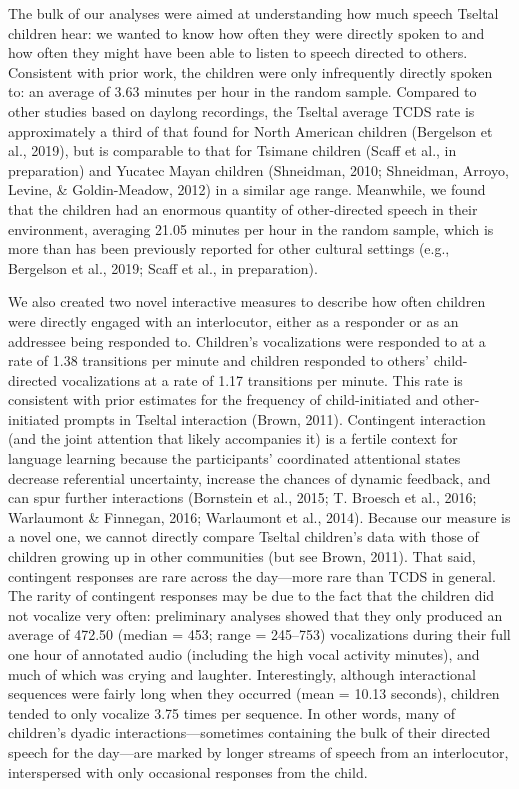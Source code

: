 \documentclass[floatsintext,man]{apa6}
\theoremstyle{definition}
\theoremstyle{definition}
\theoremstyle{definition}
\theoremstyle{remark}
\begin{document}
The bulk of our analyses were aimed at understanding how much speech
Tseltal children hear: we wanted to know how often they were directly
spoken to and how often they might have been able to listen to speech
directed to others. Consistent with prior work, the children were only
infrequently directly spoken to: an average of 3.63 minutes per hour in
the random sample. Compared to other studies based on daylong
recordings, the Tseltal average TCDS rate is approximately a third of
that found for North American children (Bergelson et al., 2019), but is
comparable to that for Tsimane children (Scaff et al., in preparation)
and Yucatec Mayan children (Shneidman, 2010; Shneidman, Arroyo, Levine,
\& Goldin-Meadow, 2012) in a similar age range. Meanwhile, we found that
the children had an enormous quantity of other-directed speech in their
environment, averaging 21.05 minutes per hour in the random sample,
which is more than has been previously reported for other cultural
settings (e.g., Bergelson et al., 2019; Scaff et al., in preparation).

We also created two novel interactive measures to describe how often
children were directly engaged with an interlocutor, either as a
responder or as an addressee being responded to. Children's
vocalizations were responded to at a rate of 1.38 transitions per minute
and children responded to others' child-directed vocalizations at a rate
of 1.17 transitions per minute. This rate is consistent with prior
estimates for the frequency of child-initiated and other-initiated
prompts in Tseltal interaction (Brown, 2011). Contingent interaction
(and the joint attention that likely accompanies it) is a fertile
context for language learning because the participants' coordinated
attentional states decrease referential uncertainty, increase the
chances of dynamic feedback, and can spur further interactions
(Bornstein et al., 2015; T. Broesch et al., 2016; Warlaumont \&
Finnegan, 2016; Warlaumont et al., 2014). Because our measure is a novel
one, we cannot directly compare Tseltal children's data with those of
children growing up in other communities (but see Brown, 2011). That
said, contingent responses are rare across the day---more rare than TCDS
in general. The rarity of contingent responses may be due to the fact
that the children did not vocalize very often: preliminary analyses
showed that they only produced an average of 472.50 (median = 453; range
= 245--753) vocalizations during their full one hour of annotated audio
(including the high vocal activity minutes), and much of which was
crying and laughter. Interestingly, although interactional sequences
were fairly long when they occurred (mean = 10.13 seconds), children
tended to only vocalize 3.75 times per sequence. In other words, many of
children's dyadic interactions---sometimes containing the bulk of their
directed speech for the day---are marked by longer streams of speech
from an interlocutor, interspersed with only occasional responses from
the child.
\end{document}
